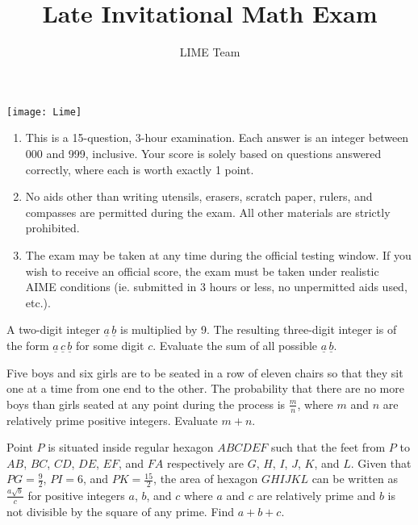 \documentclass[11pt]{scrartcl}
\title{Late Invitational Math Exam}
\author{LIME Team}
\date{}
\begin{document}
\maketitle

\begin{center}
    \texttt{[image: Lime]}
\end{center}


\normalfont{}
\begin{enumerate}
    \item This is a 15-question, 3-hour examination. Each answer is an integer between 000 and 999, inclusive. Your score is solely based on questions answered correctly, where each is worth exactly 1 point.
    \item No aids other than writing utensils, erasers, scratch paper, rulers, and compasses are permitted during the exam. All other materials are strictly prohibited.
    \item The exam may be taken at any time during the official testing window. If you wish to receive an official score, the exam must be taken under realistic AIME conditions (ie. submitted in 3 hours or less, no unpermitted aids used, etc.).
\end{enumerate}

\pagebreak

\begin{problem}
    A two-digit integer $\underline{a} \, \underline{b}$ is multiplied by 9. The resulting three-digit integer is of the form $\underline{a} \, \underline{c} \, \underline{b}$ for some digit $c$. Evaluate the sum of all possible $\underline{a} \, \underline{b}$.
\end{problem}

\begin{problem}
    Five boys and six girls are to be seated in a row of eleven chairs so that they sit one at a time from one end to the other. The probability that there are no more boys than girls seated at any point during the process is $\frac{m}{n}$, where $m$ and $n$ are relatively prime positive integers. Evaluate $m + n$.
\end{problem}

\begin{problem}
    Point $P$ is situated inside regular hexagon $ABCDEF$ such that the feet from $P$ to $AB$, $BC$, $CD$, $DE$, $EF$, and $FA$ respectively are $G$, $H$, $I$, $J$, $K$, and $L$. Given that $PG = \frac{9}{2}$, $PI = 6$, and $PK = \frac{15}{2}$, the area of hexagon $GHIJKL$ can be written as $\frac{a\sqrt{b}}{c}$ for positive integers $a$, $b$, and $c$ where $a$ and $c$ are relatively prime and $b$ is not divisible by the square of any prime. Find $a + b + c$.
\end{problem}
\end{document}
